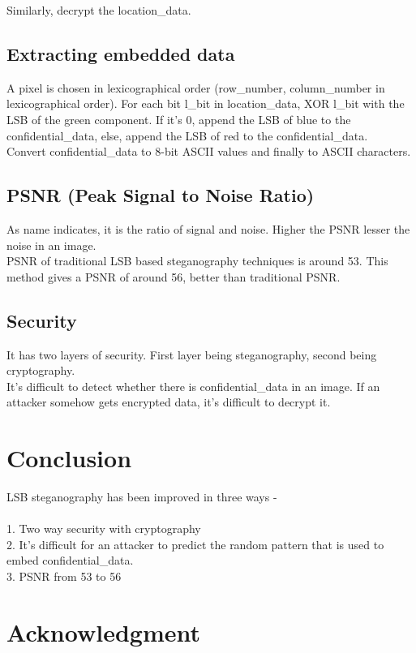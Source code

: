 \documentclass[conference]{IEEEtran}
\begin{document}
Similarly, decrypt the location\_data. \\
\subsection{Extracting embedded data}
A pixel is chosen in lexicographical order (row\_number, column\_number in lexicographical order).
For each bit l\_bit in location\_data, XOR l\_bit with the LSB of the green component.
If it's 0, append the LSB of blue to the confidential\_data, else, append the LSB of red to the confidential\_data.\\

Convert confidential\_data to 8-bit ASCII values and finally to ASCII characters.\\
\subsection{PSNR (Peak Signal to Noise Ratio)}
As name indicates, it is the ratio of signal and noise.
Higher the PSNR lesser the noise in an image.\\

PSNR of traditional LSB based steganography techniques is around 53.
This method gives a PSNR of around 56, better than traditional PSNR.\\  
\subsection{Security}
It has two layers of security.
First layer being steganography, second being cryptography.\\

It's difficult to detect whether there is confidential\_data in an image.
If an attacker somehow gets encrypted data, it's difficult to decrypt it.\\
\section{Conclusion}
LSB steganography has been improved in three ways -\\ \\
1. Two way security with cryptography\\
2. It's difficult for an attacker to predict the random pattern that is used to embed confidential\_data.\\
3. PSNR from 53 to 56 \\
\section*{Acknowledgment}
\end{document}
